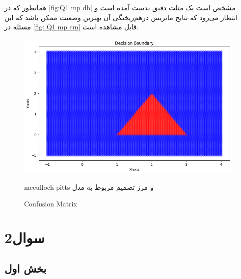 \documentclass{article}
\begin{document}
همانطور که در ‎\autoref{fig:Q1 mp db}‎ مشخص است یک مثلث دقیق بدست آمده است و انتظار می‌رود که نتایج ماتریس درهم‌ریختگی آن بهترین وضعیت ممکن باشد که این مسئله در ‎\autoref{fig: Q1 mp cm}‎ قابل مشاهده است.

\begin{figure}[H] 
	\centering
		\includegraphics[width=0.4\linewidth]{img/Q1_cp_db.png}
		\label{fig:Q1 mp db}
\caption{mcculloch-pitts و مرز تصمیم مربوط به مدل}
\end{figure}


\begin{figure}[H] 
	\centering
	\caption{Confusion Matrix}
	\label{fig: Q1 mp cm}
\end{figure}


\section{سوال2}

\subsection{بخش اول}
\end{document}
